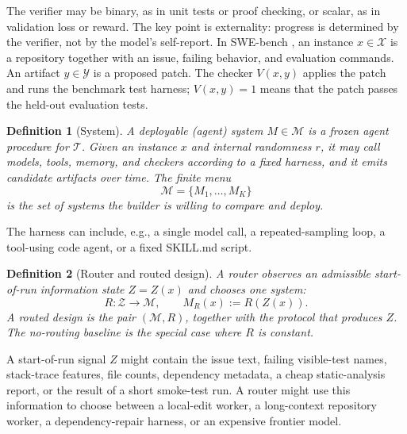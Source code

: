 \documentclass{article}
\newtheorem{definition}{Definition}
\newcommand{\cM}{\mathcal{M}}
\newcommand{\cT}{\mathcal{T}}
\newcommand{\cX}{\mathcal{X}}
\newcommand{\cY}{\mathcal{Y}}
\begin{document}
The verifier may be binary, as in unit tests or proof checking, or scalar, as in validation loss or reward.
The key point is externality: progress is determined by the verifier, not by the model's self-report.
In SWE-bench \citet{jimenez2024swebench}, an instance \(x\in\cX\) is a repository together with an issue, failing behavior, and evaluation commands.
An artifact \(y\in\cY\) is a proposed patch.
The checker \(V(x,y)\) applies the patch and runs the benchmark test harness; \(V(x,y)=1\) means that the patch passes the held-out evaluation tests.

\begin{definition}[System]
\label{def:design}
A deployable (agent) system \(M\in\cM\) is a frozen agent procedure for \(\cT\).
Given an instance \(x\) and internal randomness \(r\), it may call models, tools, memory, and checkers according to a fixed harness, and it emits candidate artifacts over time.
The finite menu
\[
    \cM=\{M_1,\ldots,M_K\}
\]
is the set of systems the builder is willing to compare and deploy.
\end{definition}

The harness can include, e.g., a single model call, a repeated-sampling loop, a tool-using code agent, or a fixed SKILL.md script.

\begin{definition}[Router and routed design]
\label{def:router}
A router observes an admissible start-of-run information state \(Z=Z(x)\) and chooses one system:
\[
    R:\mathcal Z\to\cM,
    \qquad
    M_R(x):=R(Z(x)).
\]
A routed design is the pair \((\cM,R)\), together with the protocol that produces \(Z\).
The no-routing baseline is the special case where \(R\) is constant.
\end{definition}
A start-of-run signal \(Z\) might contain the issue text, failing visible-test names, stack-trace features, file counts, dependency metadata, a cheap static-analysis report, or the result of a short smoke-test run.
A router might use this information to choose between a local-edit worker, a long-context repository worker, a dependency-repair harness, or an expensive frontier model.
\end{document}
